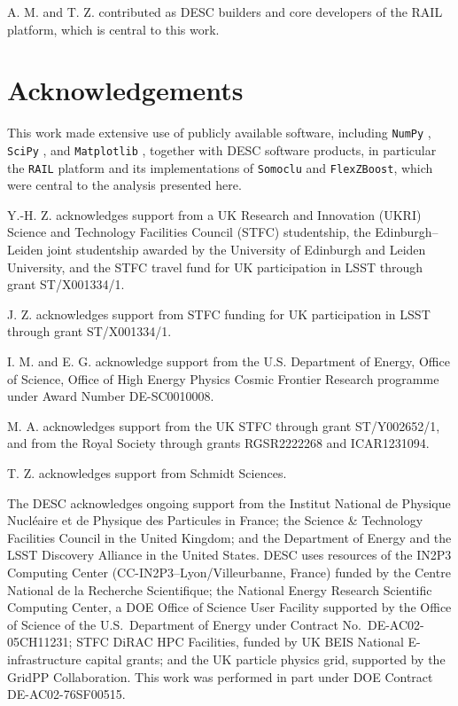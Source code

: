 \documentclass[fleqn, usenatbib]{mnras}
\begin{document}
A. M. and T. Z. contributed as DESC builders and core developers of the RAIL platform, which is central to this work.

\section*{Acknowledgements}

This work made extensive use of publicly available software, including \texttt{NumPy} \citep{2020Natur.585..357H}, \texttt{SciPy} \citep{2020NatMe..17..261V}, and \texttt{Matplotlib} \citep{2007CSE.....9...90H}, together with DESC software products, in particular the \texttt{RAIL} platform and its implementations of \texttt{Somoclu} and \texttt{FlexZBoost}, which were central to the analysis presented here.

Y.-H. Z. acknowledges support from a UK Research and Innovation (UKRI) Science and Technology Facilities Council (STFC) studentship, the Edinburgh--Leiden joint studentship awarded by the University of Edinburgh and Leiden University, and the STFC travel fund for UK participation in LSST through grant ST/X001334/1.

J. Z. acknowledges support from STFC funding for UK participation in LSST through grant ST/X001334/1.

I. M. and E. G. acknowledge support from the U.S. Department of Energy, Office of Science, Office of High Energy Physics Cosmic Frontier Research programme under Award Number DE-SC0010008.

M. A. acknowledges support from the UK STFC through grant ST/Y002652/1, and from the Royal Society through grants RGSR2222268 and ICAR1231094.

T. Z. acknowledges support from Schmidt Sciences.

The DESC acknowledges ongoing support from the Institut National de Physique Nucl\'eaire et de Physique des Particules in France; the Science \& Technology Facilities Council in the United Kingdom; and the Department of Energy and the LSST Discovery Alliance in the United States. DESC uses resources of the IN2P3 Computing Center (CC-IN2P3--Lyon/Villeurbanne, France) funded by the Centre National de la Recherche Scientifique; the National Energy Research Scientific Computing Center, a DOE Office of Science User Facility supported by the Office of Science of the U.S.\ Department of Energy under Contract No.\ DE-AC02-05CH11231; STFC DiRAC HPC Facilities, funded by UK BEIS National E-infrastructure capital grants; and the UK particle physics grid, supported by the GridPP Collaboration. This work was performed in part under DOE Contract DE-AC02-76SF00515.
\end{document}
